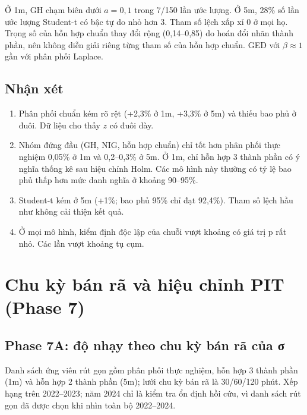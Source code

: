 \documentclass[11pt,a4paper]{article}
\begin{document}
Ở 1m, GH chạm biên dưới $a=0{,}1$ trong 7/150 lần ước lượng. Ở 5m, 28\% số lần ước lượng Student-t có bậc tự do nhỏ hơn 3. Tham số lệch xấp xỉ 0 ở mọi họ. Trọng số của hỗn hợp chuẩn thay đổi rộng (0,14--0,85) do hoán đổi nhãn thành phần, nên không diễn giải riêng từng tham số của hỗn hợp chuẩn. GED với $\beta\approx1$ gần với phân phối Laplace.

\subsection{Nhận xét}

\begin{enumerate}[nosep]
\item Phân phối chuẩn kém rõ rệt (+2,3\% ở 1m, +3,3\% ở 5m) và thiếu bao phủ ở đuôi. Dữ liệu cho thấy $z$ có đuôi dày.
\item Nhóm đứng đầu (GH, NIG, hỗn hợp chuẩn) chỉ tốt hơn phân phối thực nghiệm 0,05\% ở 1m và 0,2--0,3\% ở 5m. Ở 1m, chỉ hỗn hợp 3 thành phần có ý nghĩa thống kê sau hiệu chỉnh Holm. Các mô hình này thường có tỷ lệ bao phủ thấp hơn mức danh nghĩa ở khoảng 90--95\%.
\item Student-t kém ở 5m (+1\%; bao phủ 95\% chỉ đạt 92,4\%). Tham số lệch hầu như không cải thiện kết quả.
\item Ở mọi mô hình, kiểm định độc lập của chuỗi vượt khoảng có giá trị p rất nhỏ. Các lần vượt khoảng tụ cụm.
\end{enumerate}

\section{Chu kỳ bán rã và hiệu chỉnh PIT (Phase 7)}

\subsection{Phase 7A: độ nhạy theo chu kỳ bán rã của σ}

Danh sách ứng viên rút gọn gồm phân phối thực nghiệm, hỗn hợp 3 thành phần (1m) và hỗn hợp 2 thành phần (5m); lưới chu kỳ bán rã là 30/60/120 phút. Xếp hạng trên 2022--2023; năm 2024 chỉ là kiểm tra ổn định hồi cứu, vì danh sách rút gọn đã được chọn khi nhìn toàn bộ 2022--2024.
\end{document}
